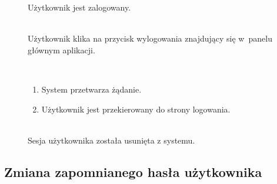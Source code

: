 \documentclass[11pt]{aghdpl}
\begin{document}
	\begin{description}
		\item[\useCaseAktor] \hfill \\
			\useCaseUzytkownik
		\item[\useCaseWarPocz] \hfill \\
			Użytkownik jest zalogowany.
		\item[\useCaseZdarzInicj] \hfill \\
			Użytkownik klika na przycisk wylogowania znajdujący się w~panelu głównym aplikacji.
		\item[\useCaseScenBaz] \hfill \\ 
			\begin{enumerate}
			\item System przetwarza żądanie.
			\item Użytkownik jest przekierowany do strony logowania.
			\end{enumerate}
		\item[\useCaseWarKonc] \hfill \\ 
			Sesja użytkownika została usunięta z systemu.
	\end{description}

\subsection{Zmiana zapomnianego hasła użytkownika}
\end{document}
